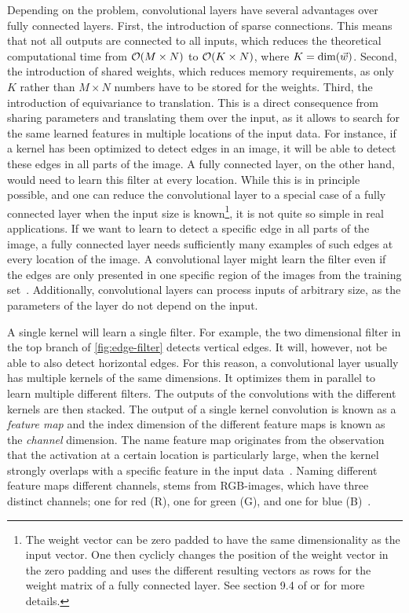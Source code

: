Depending on the problem, convolutional layers have several advantages over fully connected layers. First, the introduction of sparse connections. This means that not all outputs are connected to all inputs, which reduces the theoretical computational time from $\mathcal{O}{\left( M\times N \right)}$ to $\mathcal{O}{\left( K\times N \right)}$, where $K=\text{dim}{\left( \vec{w} \right)}$. Second, the introduction of shared weights, which reduces memory requirements, as only $K$ rather than $M\times N$ numbers have to be stored for the weights. Third, the introduction of equivariance to translation. This is a direct consequence from sharing parameters and translating them over the input, as it allows to search for the same learned features in multiple locations of the input data. For instance, if a kernel has been optimized to detect edges in an image, it will be able to detect these edges in all parts of the image. A fully connected layer, on the other hand, would need to learn this filter at every location. While this is in principle possible, and one can reduce the convolutional layer to a special case of a fully connected layer when the input size is known\footnote{The weight vector can be zero padded to have the same dimensionality as the input vector. One then cyclicly changes the position of the weight vector in the zero padding and uses the different resulting vectors as rows for the weight matrix of a fully connected layer. See section 9.4 of \cite{Goodfellow:2016:DNN} or \cite{Schaefer:2019:MSC} for more details.}, it is not quite so simple in real applications. If we want to learn to detect a specific edge in all parts of the image, a fully connected layer needs sufficiently many examples of such edges at every location of the image. A convolutional layer might learn the filter even if the edges are only presented in one specific region of the images from the training set~\cite{Goodfellow:2016:DNN}. %
Additionally, convolutional layers can process inputs of arbitrary size, as the parameters of the layer do not depend on the input.

A single kernel will learn a single filter. For example, the two dimensional filter in the top branch of \autoref{fig:edge-filter} detects vertical edges. It will, however, not be able to also detect horizontal edges. For this reason, a convolutional layer usually has multiple kernels of the same dimensions. It optimizes them in parallel to learn multiple different filters. The outputs of the convolutions with the different kernels are then stacked. The output of a single kernel convolution is known as a \emph{feature map} and the index dimension of the different feature maps is known as the \emph{channel} dimension. The name feature map originates from the observation that the activation at a certain location is particularly large, when the kernel strongly overlaps with a specific feature in the input data~\cite{Zeiler:2014aaa}. Naming different feature maps different channels, stems from RGB-images, which have three distinct channels; one for red (R), one for green (G), and one for blue (B)~\cite{Goodfellow:2016:DNN}.%

